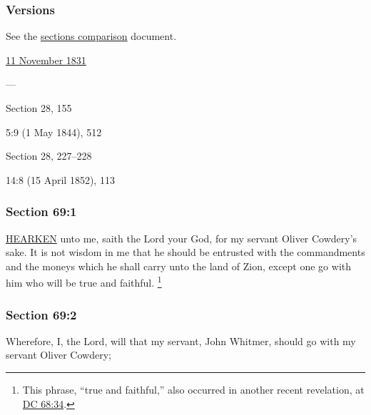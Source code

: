 	\subsubsection{Versions}
		\label{DC69-V}
		
		See the \href{https://drive.google.com/file/d/1goAvNz8jS4R8slYfMG_db55Ty2z_vmgK/view?usp=sharing}{sections comparison} document.
	
		\begin{compactdesc}
			\item[JSP] \hyperref[EMS-1831-JS-11-NOV-1831-A]{11 November 1831}
			\item[BC] ---
			\item[DC 1835] Section 28, 155
			\item[TS] 5:9 (1 May 1844), 512
			\item[DC 1844] Section 28, 227--228
			\item[MS] 14:8 (15 April 1852), 113
		\end{compactdesc}

	\subsubsection{Section 69:1} %
		\label{DC69-1}

		\hyperref[HEARKEN]{HEARKEN} unto me, saith the Lord your God, for my servant Oliver Cowdery's sake.  It is not wisdom in me that he should be entrusted with the commandments and the moneys which he shall carry unto the land of Zion, except one go with him who will be true and faithful.%
			\footnote{%
				This phrase, ``true and faithful,'' also occurred in another recent revelation, at \hyperref[DC68-34]{DC 68:34}.
				}


	\subsubsection{Section 69:2} %
		\label{DC69-2}

		Wherefore, I, the Lord, will that my servant, John Whitmer, should go with my servant Oliver Cowdery;

